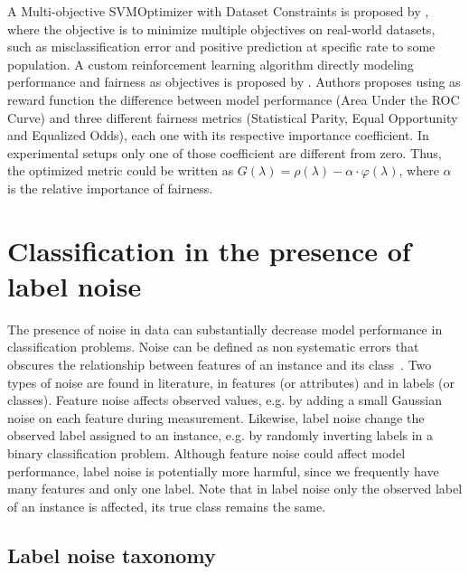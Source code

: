 A Multi-objective SVMOptimizer with Dataset Constraints is proposed by \cite{Goh2016}, where the objective is to minimize multiple objectives on real-world datasets, such as misclassification error and positive prediction at specific rate to some population. A custom reinforcement learning algorithm directly modeling performance and fairness as objectives is proposed by \cite{Petrovic2021}. Authors proposes using as reward function the difference between model performance (Area Under the ROC Curve) and three different fairness metrics (Statistical Parity, Equal Opportunity and Equalized Odds), each one with its respective importance coefficient. In experimental setups only one of those coefficient are different from zero. Thus, the optimized metric could be written as $G(\lambda) = \rho(\lambda) - \alpha \cdot \varphi(\lambda)$, where $\alpha$ is the relative importance of fairness.


\section{Classification in the presence of label noise}



The presence of noise in data can substantially decrease model performance in classification problems. Noise can be defined as non systematic errors that obscures the relationship between features of an instance and its class~\citep{Frenay2014,Hickey1996,Quinlan1986}. Two types of noise are found in literature, in features (or attributes) and in labels (or classes). Feature noise affects observed values, e.g. by adding a small Gaussian noise on each feature during measurement. Likewise, label noise change the observed label assigned to an instance, e.g. by randomly inverting labels in a binary classification problem. Although feature noise could affect model performance, label noise is potentially more harmful, since we frequently have many features and only one label. Note that in label noise only the observed label of an instance is affected, its true class remains the same.

\subsection{Label noise taxonomy}

